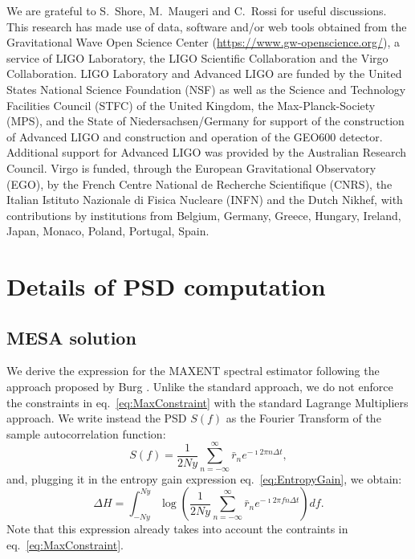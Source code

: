 \documentclass[twocolumn,showpacs,preprintnumbers,nofootinbib,prd,
superscriptaddress,10pt]{revtex4-1}
\begin{document}
\begin{acknowledgments}
We are grateful to S.~Shore, M.~Maugeri and C.~Rossi for useful discussions.\\
This research has made use of data, software and/or web tools obtained from the Gravitational Wave Open Science Center (\url{https://www.gw-openscience.org/}), a service of LIGO Laboratory, the LIGO Scientific Collaboration and the Virgo Collaboration. LIGO Laboratory and Advanced LIGO are funded by the United States National Science Foundation (NSF) as well as the Science and Technology Facilities Council (STFC) of the United Kingdom, the Max-Planck-Society (MPS), and the State of Niedersachsen/Germany for support of the construction of Advanced LIGO and construction and operation of the GEO600 detector. Additional support for Advanced LIGO was provided by the Australian Research Council. Virgo is funded, through the European Gravitational Observatory (EGO), by the French Centre National de Recherche Scientifique (CNRS), the Italian Istituto Nazionale di Fisica Nucleare (INFN) and the Dutch Nikhef, with contributions by institutions from Belgium, Germany, Greece, Hungary, Ireland, Japan, Monaco, Poland, Portugal, Spain.
\end{acknowledgments}

\pagebreak
\appendix
\section{Details of PSD computation} \label{sec:appendix}
\subsection{MESA solution}\label{sec:MESA_solution}
We derive the expression for the MAXENT spectral estimator following the approach proposed by Burg \cite{burg1975maximum}.
Unlike the standard approach, we do not enforce the constraints in eq.~\eqref{eq:MaxConstraint} with the standard Lagrange Multipliers approach.
We write instead the PSD $S(f)$ as the Fourier Transform of the sample autocorrelation function: 
\begin{equation}
    S(f) = \frac{1}{2 Ny}\sum_{n = -\infty}^{\infty} \bar r_n e^{- \imath 2 \pi n \Delta t},
\end{equation}
and, plugging it in the entropy gain expression eq.~\eqref{eq:EntropyGain}, we obtain:
\begin{equation}
    \Delta H = \int_{-Ny}^{Ny}  
    \log\left(\frac{1}{2 Ny}\sum_{n = -\infty}^{\infty} \bar r_n e^{-\imath 2 \pi f n \Delta t} 
    \right) df.
\end{equation}
Note that this expression already takes into account the contraints in eq.~\eqref{eq:MaxConstraint}.
\end{document}
